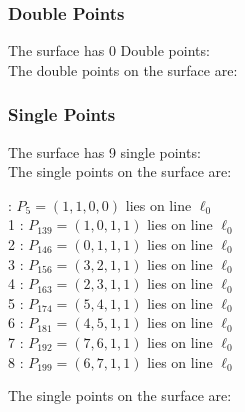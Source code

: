 \documentclass{article}
\begin{document}
{\subsubsection*{Double Points}
The surface has 0 Double points:\\
The double points on the surface are:\\
\begin{multicols}{2}
\noindent
\end{multicols}
\subsubsection*{Single Points}
The surface has 9 single points:\\
The single points on the surface are:\\
\begin{multicols}{2}
 : $P_{5}=( 1, 1, 0, 0 )$ lies on line $\ell_{0}$\\
1 : $P_{139}=( 1, 0, 1, 1 )$ lies on line $\ell_{0}$\\
2 : $P_{146}=( 0, 1, 1, 1 )$ lies on line $\ell_{0}$\\
3 : $P_{156}=( 3, 2, 1, 1 )$ lies on line $\ell_{0}$\\
4 : $P_{163}=( 2, 3, 1, 1 )$ lies on line $\ell_{0}$\\
5 : $P_{174}=( 5, 4, 1, 1 )$ lies on line $\ell_{0}$\\
6 : $P_{181}=( 4, 5, 1, 1 )$ lies on line $\ell_{0}$\\
7 : $P_{192}=( 7, 6, 1, 1 )$ lies on line $\ell_{0}$\\
8 : $P_{199}=( 6, 7, 1, 1 )$ lies on line $\ell_{0}$\\
\end{multicols}
The single points on the surface are:\\
}
\end{document}
